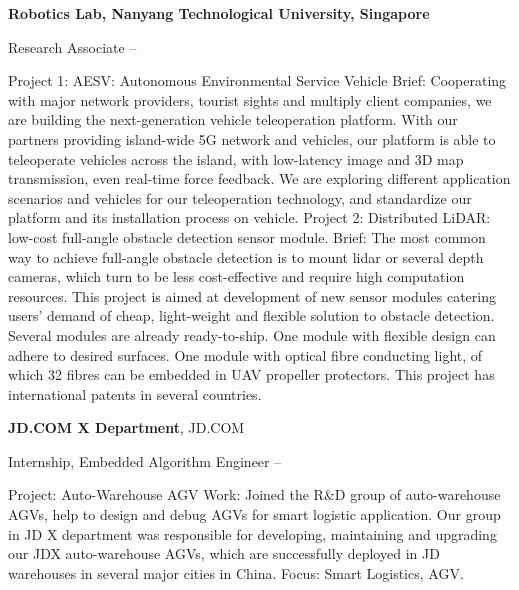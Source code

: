 \documentclass[letterpaper,MMMyyyy,nonstopmode]{simpleresumecv}
\begin{document}
\begin{Body}
\Entry
{\textbf{Robotics Lab, Nanyang Technological University, Singapore}}

\BulletItem
Research Associate
\hfill
{} --
\begin{Detail}
\SubBulletItem
Project 1:
AESV: Autonomous Environmental Service Vehicle
\SubBulletItem
Brief:
Cooperating with major network providers, tourist sights and multiply client companies, we are building the next-generation vehicle teleoperation platform.
With our partners providing island-wide 5G network and vehicles, our platform is able to teleoperate vehicles across the island, with low-latency image and 3D map transmission, even real-time force feedback.
We are exploring different application scenarios and vehicles for our teleoperation technology, and standardize our platform and its installation process on vehicle.
\SubBulletItem 
Project 2:
Distributed LiDAR: low-cost full-angle obstacle detection sensor module.
\SubBulletItem
Brief:
The most common way to achieve full-angle obstacle detection is to mount lidar or several depth cameras, which turn to be less cost-effective and require high computation resources.
This project is aimed at development of new sensor modules catering users' demand of cheap, light-weight and flexible solution to obstacle detection.
Several modules are already ready-to-ship.
One module with flexible design can adhere to desired surfaces.
One module with optical fibre conducting light, of which 32 fibres can be embedded in UAV propeller protectors.
This project has international patents in several countries.
\end{Detail}




\Entry
{\textbf{JD.COM X Department}}, JD.COM

\BulletItem
Internship, Embedded Algorithm Engineer
\hfill
{} --
\begin{Detail}
	\SubBulletItem
	Project:
	Auto-Warehouse AGV
	\SubBulletItem
	Work:
	Joined the R\&D group of auto-warehouse AGVs, help to design and debug AGVs for smart logistic application.
	Our group in JD X department was responsible for developing, maintaining and upgrading our JDX auto-warehouse AGVs, which are successfully deployed in JD warehouses in several major cities in China.
	\SubBulletItem
	Focus:
	Smart Logistics, AGV.
\end{Detail}





\end{Body}
\end{document}
